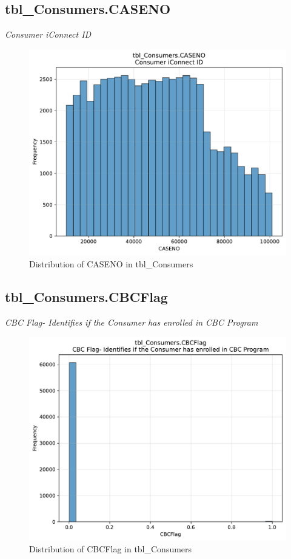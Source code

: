 \subsection{tbl\_Consumers.CASENO}
\textit{Consumer iConnect ID}

\begin{figure}[htbp]
\centering
\includegraphics[width=\textwidth]{figures/dbo_tbl_Consumers_CASENO.pdf}
\caption{Distribution of CASENO in tbl\_Consumers}
\end{figure}\newpage

\subsection{tbl\_Consumers.CBCFlag}
\textit{CBC Flag- Identifies if the Consumer has enrolled in CBC Program}

\begin{figure}[htbp]
\centering
\includegraphics[width=\textwidth]{figures/dbo_tbl_Consumers_CBCFlag.pdf}
\caption{Distribution of CBCFlag in tbl\_Consumers}
\end{figure}\newpage

